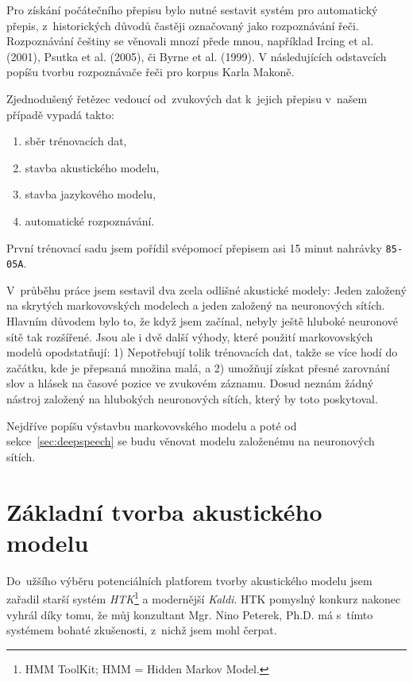 Pro získání počátečního přepisu bylo nutné sestavit
systém pro automatický přepis, z~historických důvodů častěji označovaný jako
rozpoznávání řeči. Rozpoznávání češtiny se věnovali mnozí přede mnou,
například Ircing et al. (2001)\cite{ircing2001large}, Psutka et al.
(2005)\cite{psutka2005automatic}, či Byrne et al. (1999)\cite{byrne1999large}.
V následujících odstavcích popíšu tvorbu rozpoznávače řeči pro korpus Karla
Makoně.

Zjednodušený řetězec vedoucí od~zvukových dat k~jejich přepisu v~našem případě
vypadá takto:\begin{enumerate}
\item{sběr trénovacích dat,}
\item{stavba akustického modelu,}
\item{stavba jazykového modelu,}
\item{automatické rozpoznávání.}
\end{enumerate}

První trénovací sadu jsem pořídil svépomocí přepisem asi 15 minut nahrávky
\texttt{85-05A}.

V~průběhu práce jsem sestavil dva zcela odlišné akustické modely: Jeden založený
na skrytých markovovských modelech a jeden založený na neuronových sítích.
Hlavním důvodem bylo to, že když jsem začínal, nebyly ještě hluboké neuronové
sítě tak rozšířené. Jsou ale i dvě další výhody, které použití markovovských
modelů opodstatňují: 1) Nepotřebují tolik trénovacích dat, takže se více hodí do
začátku, kde je přepsaná množina malá, a 2) umožňují získat přesné zarovnání
slov a hlásek na časové pozice ve zvukovém záznamu. Dosud neznám žádný nástroj
založený na hlubokých neuronových sítích, který by toto poskytoval.

Nejdříve popíšu výstavbu markovovského modelu a poté od
sekce~\ref{sec:deepspeech} se budu věnovat modelu založenému na neuronových
sítích.

\section{Základní tvorba akustického modelu}

Do~užšího výběru potenciálních platforem tvorby akustického modelu jsem zařadil
starší systém \textit{HTK}\footnote{HMM ToolKit; HMM = Hidden Markov Model.}\cite{young2002htk} a
modernější \textit{Kaldi}\cite{povey2011kaldi}. HTK pomyslný konkurz nakonec
vyhrál díky tomu, že můj konzultant Mgr. Nino Peterek, Ph.D. má s~tímto systémem
bohaté zkušenosti, z~nichž jsem mohl čerpat.

